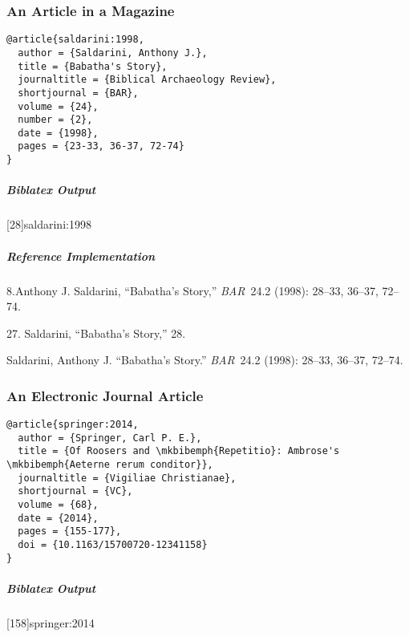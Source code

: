 \documentclass[a4paper]{article}
\newenvironment{biboutput}{%
  \subparagraph{Biblatex Output}
}{\color{black}}
\newenvironment{refimp}{%
  \subparagraph{Reference Implementation}
  \color{reference-colour}
  \rm
}{\par\color{black}}
\begin{document}
\subsubsection{An Article in a Magazine}

\begin{lstlisting}
@article{saldarini:1998,
  author = {Saldarini, Anthony J.},
  title = {Babatha's Story},
  journaltitle = {Biblical Archaeology Review},
  shortjournal = {BAR},
  volume = {24},
  number = {2},
  date = {1998},
  pages = {23-33, 36-37, 72-74}
}
\end{lstlisting}  

\begin{biboutput}
  [28]{saldarini:1998}
\end{biboutput}

\begin{refimp}
  \hspace*{\bibindent}8.Anthony J. Saldarini, “Babatha’s Story,”
  \emph{BAR}~24.2 (1998): 28–33, 36–37, 72–74.

  \hspace*{\bibindent}27. Saldarini, “Babatha’s Story,” 28.

 \hangindent\bibindent Saldarini, Anthony J. “Babatha’s Story.”
 \emph{BAR}~24.2 (1998): 28–33, 36–37, 72–74.

\end{refimp}

\subsubsection{An Electronic Journal Article}

\begin{lstlisting}
@article{springer:2014,
  author = {Springer, Carl P. E.},
  title = {Of Roosers and \mkbibemph{Repetitio}: Ambrose's \mkbibemph{Aeterne rerum conditor}},
  journaltitle = {Vigiliae Christianae},
  shortjournal = {VC},
  volume = {68},
  date = {2014},
  pages = {155-177},
  doi = {10.1163/15700720-12341158}
}
\end{lstlisting}

\begin{biboutput}
  [158]{springer:2014}
\end{biboutput}
\end{document}
